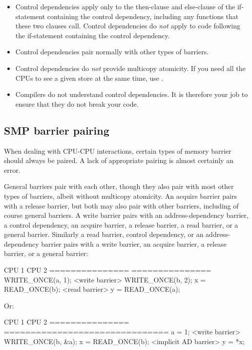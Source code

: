 \begin{itemize}
 \item
      Control dependencies apply only to the then-clause and else-clause
      of the if-statement containing the control dependency, including
      any functions that these two clauses call.
      Control dependencies do \emph{not} apply to code following the
      if-statement containing the control dependency.

 \item
      Control dependencies pair normally with other types of barriers.

 \item
      Control dependencies do \emph{not} provide multicopy atomicity.
      If you need all the CPUs to see a given store at the same time,
      use .

 \item
      Compilers do not understand control dependencies.
      It is therefore your job to ensure that they do not break your code.
\end{itemize}

\subsection{SMP barrier pairing}

When dealing with CPU-CPU interactions, certain types of memory barrier should
always be paired.
A lack of appropriate pairing is almost certainly an error.

General barriers pair with each other, though they also pair with most
other types of barriers, albeit without multicopy atomicity.
An acquire barrier pairs with a release barrier, but both may also pair
with other barriers, including of course general barriers.
A write barrier pairs with an address-dependency barrier,
a control dependency, an acquire barrier, a release barrier,
a read barrier, or a general barrier.
Similarly a read barrier, control dependency, or
an address-dependency barrier pairs with a write barrier,
an acquire barrier, a release barrier, or a general barrier:

\begin{VerbatimU}
	CPU 1                 CPU 2
	===============       ===============
	WRITE_ONCE(a, 1);
	<write barrier>
	WRITE_ONCE(b, 2);     x = READ_ONCE(b);
	                      <read barrier>
	                      y = READ_ONCE(a);
\end{VerbatimU}

Or:

\begin{VerbatimU}
	CPU 1                 CPU 2
	===============	      ===============================
	a = 1;
	<write barrier>
	WRITE_ONCE(b, &a);    x = READ_ONCE(b);
	                      <implicit AD barrier>
	                      y = *x;
\end{VerbatimU}

